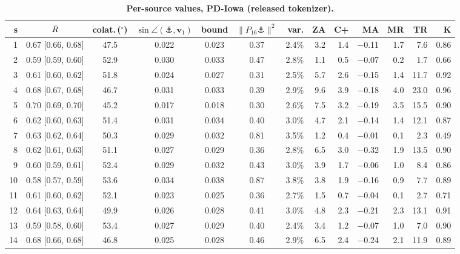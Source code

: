 \begin{table}[p]
\renewcommand{\baselinestretch}{1}
\caption{{\bf Per-source values, PD-Iowa (released tokenizer).}}
\label{tab:supp-pd_iowa}
\centering\scriptsize
\setlength{\tabcolsep}{2.5pt}
\begin{tabular}{rcccccrrrrrrr}
\toprule
\textbf{s} & $\bar{R}$ & \textbf{colat.}\,($^\circ$) & $\sin\angle(\anchor,\bm{v}_1)$ & \textbf{bound} & $\|P_{16}\anchor\|^2$ & \textbf{var.} & \textbf{ZA} & \textbf{C+} & \textbf{MA} & \textbf{MR} & \textbf{TR} & \textbf{K} \\
\midrule
1 & 0.67 [0.66, 0.68] & 47.5 & 0.022 & 0.023 & 0.37 & 2.4\% & 3.2 & 1.4 & $-$0.11 & 1.7 & 7.6 & 0.86 \\
2 & 0.59 [0.59, 0.60] & 52.9 & 0.030 & 0.033 & 0.47 & 2.8\% & 1.1 & 0.5 & $-$0.07 & 0.2 & 1.7 & 0.66 \\
3 & 0.61 [0.60, 0.62] & 51.8 & 0.024 & 0.027 & 0.31 & 2.5\% & 5.7 & 2.6 & $-$0.15 & 1.4 & 11.7 & 0.92 \\
4 & 0.68 [0.67, 0.68] & 46.7 & 0.031 & 0.033 & 0.39 & 2.9\% & 9.6 & 3.9 & $-$0.18 & 4.0 & 23.0 & 0.96 \\
5 & 0.70 [0.69, 0.70] & 45.2 & 0.017 & 0.018 & 0.30 & 2.6\% & 7.5 & 3.2 & $-$0.19 & 3.5 & 15.5 & 0.90 \\
6 & 0.62 [0.60, 0.63] & 51.4 & 0.031 & 0.034 & 0.40 & 3.0\% & 4.7 & 2.1 & $-$0.14 & 1.4 & 12.1 & 0.87 \\
7 & 0.63 [0.62, 0.64] & 50.3 & 0.029 & 0.032 & 0.81 & 3.5\% & 1.2 & 0.4 & $-$0.01 & 0.1 & 2.3 & 0.49 \\
8 & 0.62 [0.61, 0.63] & 51.1 & 0.027 & 0.029 & 0.36 & 2.8\% & 6.5 & 3.0 & $-$0.32 & 1.9 & 13.5 & 0.90 \\
9 & 0.60 [0.59, 0.61] & 52.4 & 0.029 & 0.032 & 0.43 & 3.0\% & 3.9 & 1.7 & $-$0.06 & 1.0 & 8.4 & 0.86 \\
10 & 0.58 [0.57, 0.59] & 53.6 & 0.034 & 0.038 & 0.87 & 3.8\% & 3.8 & 1.9 & $-$0.16 & 0.9 & 7.7 & 0.89 \\
11 & 0.61 [0.60, 0.62] & 52.1 & 0.023 & 0.025 & 0.36 & 2.7\% & 1.5 & 0.7 & $-$0.04 & 0.1 & 2.7 & 0.71 \\
12 & 0.64 [0.63, 0.64] & 49.9 & 0.026 & 0.028 & 0.41 & 3.0\% & 4.8 & 2.3 & $-$0.21 & 2.3 & 13.1 & 0.91 \\
13 & 0.59 [0.58, 0.60] & 53.4 & 0.027 & 0.029 & 0.40 & 2.4\% & 3.4 & 1.2 & $-$0.07 & 1.0 & 7.0 & 0.90 \\
14 & 0.68 [0.66, 0.68] & 46.8 & 0.025 & 0.028 & 0.46 & 2.9\% & 6.5 & 2.4 & $-$0.24 & 2.1 & 11.9 & 0.89 \\

\end{tabular}
\end{table}
